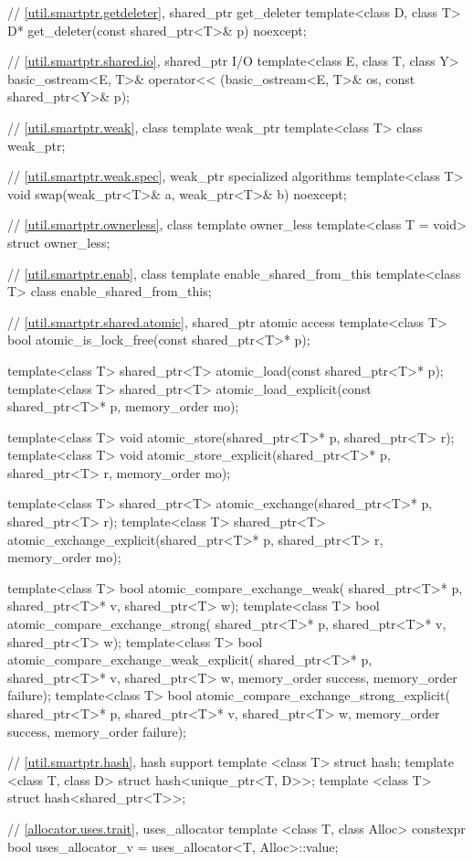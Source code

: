 \begin{codeblock}
{  // \ref{util.smartptr.getdeleter}, shared_ptr get_deleter
  template<class D, class T>
    D* get_deleter(const shared_ptr<T>& p) noexcept;

  // \ref{util.smartptr.shared.io}, shared_ptr I/O
  template<class E, class T, class Y>
    basic_ostream<E, T>& operator<< (basic_ostream<E, T>& os, const shared_ptr<Y>& p);

  // \ref{util.smartptr.weak}, class template weak_ptr
  template<class T> class weak_ptr;

  // \ref{util.smartptr.weak.spec}, weak_ptr specialized algorithms
  template<class T> void swap(weak_ptr<T>& a, weak_ptr<T>& b) noexcept;

  // \ref{util.smartptr.ownerless}, class template owner_less
  template<class T = void> struct owner_less;

  // \ref{util.smartptr.enab}, class template enable_shared_from_this
  template<class T> class enable_shared_from_this;

  // \ref{util.smartptr.shared.atomic}, shared_ptr atomic access
  template<class T>
    bool atomic_is_lock_free(const shared_ptr<T>* p);

  template<class T>
    shared_ptr<T> atomic_load(const shared_ptr<T>* p);
  template<class T>
    shared_ptr<T> atomic_load_explicit(const shared_ptr<T>* p, memory_order mo);

  template<class T>
    void atomic_store(shared_ptr<T>* p, shared_ptr<T> r);
  template<class T>
    void atomic_store_explicit(shared_ptr<T>* p, shared_ptr<T> r, memory_order mo);

  template<class T>
    shared_ptr<T> atomic_exchange(shared_ptr<T>* p, shared_ptr<T> r);
  template<class T>
    shared_ptr<T> atomic_exchange_explicit(shared_ptr<T>* p, shared_ptr<T> r, memory_order mo);

  template<class T>
    bool atomic_compare_exchange_weak(
      shared_ptr<T>* p, shared_ptr<T>* v, shared_ptr<T> w);
  template<class T>
    bool atomic_compare_exchange_strong(
      shared_ptr<T>* p, shared_ptr<T>* v, shared_ptr<T> w);
  template<class T>
    bool atomic_compare_exchange_weak_explicit(
      shared_ptr<T>* p, shared_ptr<T>* v, shared_ptr<T> w,
      memory_order success, memory_order failure);
  template<class T>
    bool atomic_compare_exchange_strong_explicit(
      shared_ptr<T>* p, shared_ptr<T>* v, shared_ptr<T> w,
      memory_order success, memory_order failure);

  // \ref{util.smartptr.hash}, hash support
  template <class T> struct hash;
  template <class T, class D> struct hash<unique_ptr<T, D>>;
  template <class T> struct hash<shared_ptr<T>>;

  // \ref{allocator.uses.trait}, uses_allocator
  template <class T, class Alloc>
    constexpr bool uses_allocator_v = uses_allocator<T, Alloc>::value;
}
\end{codeblock}

